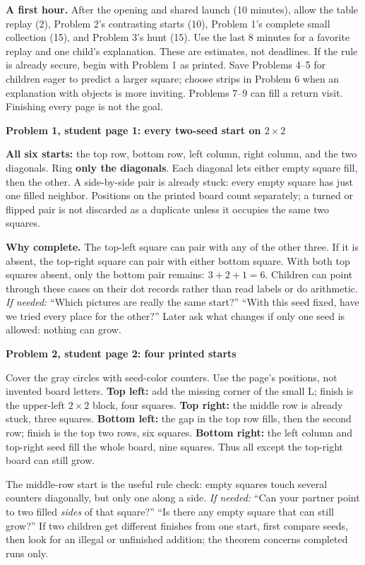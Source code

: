 \documentclass[11pt]{article}
\newcommand{\sub}[1]{\par\textbf{#1}\par}
\newcommand{\hint}[1]{\textit{If needed:} #1}
\begin{document}
\textbf{A first hour.} After the opening and shared launch (10 minutes), allow the table replay (2), Problem 2's contrasting starts (10), Problem 1's complete small collection (15), and Problem 3's hunt (15). Use the last 8 minutes for a favorite replay and one child's explanation. These are estimates, not deadlines. If the rule is already secure, begin with Problem 1 as printed. Save Problems 4--5 for children eager to predict a larger square; choose strips in Problem 6 when an explanation with objects is more inviting. Problems 7--9 can fill a return visit. Finishing every page is not the goal.

\sub{Problem 1, student page 1: every two-seed start on $2\times2$}
\textbf{All six starts:} the top row, bottom row, left column, right column, and the two diagonals. Ring \textbf{only the diagonals}. Each diagonal lets either empty square fill, then the other. A side-by-side pair is already stuck: every empty square has just one filled neighbor. Positions on the printed board count separately; a turned or flipped pair is not discarded as a duplicate unless it occupies the same two squares.

\textbf{Why complete.} The top-left square can pair with any of the other three. If it is absent, the top-right square can pair with either bottom square. With both top squares absent, only the bottom pair remains: $3+2+1=6$. Children can point through these cases on their dot records rather than read labels or do arithmetic. \hint{``Which pictures are really the same start?'' ``With this seed fixed, have we tried every place for the other?''} Later ask what changes if only one seed is allowed: nothing can grow.

\sub{Problem 2, student page 2: four printed starts}
Cover the gray circles with seed-color counters. Use the page's positions, not invented board letters. \textbf{Top left:} add the missing corner of the small L; finish is the upper-left $2\times2$ block, four squares. \textbf{Top right:} the middle row is already stuck, three squares. \textbf{Bottom left:} the gap in the top row fills, then the second row; finish is the top two rows, six squares. \textbf{Bottom right:} the left column and top-right seed fill the whole board, nine squares. Thus all except the top-right board can still grow.

The middle-row start is the useful rule check: empty squares touch several counters diagonally, but only one along a side. \hint{``Can your partner point to two filled \emph{sides} of that square?'' ``Is there any empty square that can still grow?''} If two children get different finishes from one start, first compare seeds, then look for an illegal or unfinished addition; the theorem concerns completed runs only.
\end{document}
